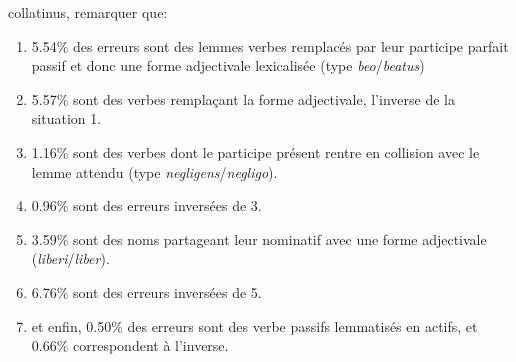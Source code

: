 collatinus, remarquer que:

\begin{enumerate}
    \item 5.54\% des erreurs sont des lemmes verbes remplacés par leur participe parfait passif et donc une forme adjectivale lexicalisée (type \textit{beo}/\textit{beatus})
    \item 5.57\% sont des verbes remplaçant la forme adjectivale, l'inverse de la situation 1.
    \item 1.16\% sont des verbes dont le participe présent rentre en collision avec le lemme attendu (type \textit{negligens}/\textit{negligo}).
    \item 0.96\% sont des erreurs inversées de 3.
    \item 3.59\% sont des noms partageant leur nominatif avec une forme adjectivale (\textit{liberi}/\textit{liber}).
    \item 6.76\% sont des erreurs inversées de 5.
    \item et enfin, 0.50\% des erreurs sont des verbe passifs lemmatisés en actifs, et 0.66\% correspondent à l'inverse.
\end{enumerate}

